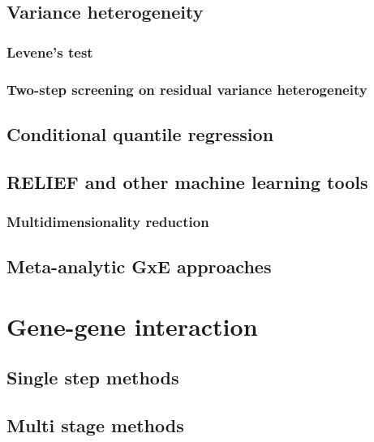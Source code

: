 \documentclass[]{book}
\theoremstyle{definition}
\theoremstyle{definition}
\theoremstyle{definition}
\theoremstyle{remark}
\begin{document}
\section{Variance heterogeneity}\label{variance-heterogeneity}

\subsection{Levene's test}\label{levenes-test}

\subsection{Two-step screening on residual variance
heterogeneity}\label{two-step-screening-on-residual-variance-heterogeneity}

\section{Conditional quantile
regression}\label{conditional-quantile-regression}

\section{RELIEF and other machine learning
tools}\label{relief-and-other-machine-learning-tools}

\subsection{Multidimensionality
reduction}\label{multidimensionality-reduction}

\section{Meta-analytic GxE
approaches}\label{meta-analytic-gxe-approaches}

\chapter{Gene-gene interaction}\label{gene-gene-interaction}

\section{Single step methods}\label{single-step-methods-1}

\section{Multi stage methods}\label{multi-stage-methods-1}
\end{document}
